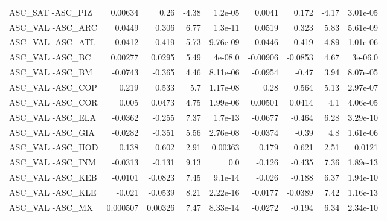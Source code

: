 \begin{tabular}{lrrrrrrrr}
ASC\_SAT -ASC\_PIZ                        &     0.00634 &         0.26 &   -4.38 &  1.2e-05 &     0.0041 &       0.172 &        -4.17 &      3.01e-05 \\
ASC\_VAL -ASC\_ARC                        &      0.0449 &        0.306 &    6.77 &  1.3e-11 &     0.0519 &       0.323 &         5.83 &      5.61e-09 \\
ASC\_VAL -ASC\_ATL                        &      0.0412 &        0.419 &    5.73 & 9.76e-09 &     0.0446 &       0.419 &         4.89 &      1.01e-06 \\
ASC\_VAL -ASC\_BC                         &     0.00277 &       0.0295 &    5.49 &  4e-08.0 &   -0.00906 &     -0.0853 &         4.67 &       3e-06.0 \\
ASC\_VAL -ASC\_BM                         &     -0.0743 &       -0.365 &    4.46 & 8.11e-06 &    -0.0954 &       -0.47 &         3.94 &      8.07e-05 \\
ASC\_VAL -ASC\_COP                        &       0.219 &        0.533 &     5.7 & 1.17e-08 &       0.28 &       0.564 &         5.13 &      2.97e-07 \\
ASC\_VAL -ASC\_COR                        &       0.005 &       0.0473 &    4.75 & 1.99e-06 &    0.00501 &      0.0414 &          4.1 &      4.06e-05 \\
ASC\_VAL -ASC\_ELA                        &     -0.0362 &       -0.255 &    7.37 &  1.7e-13 &    -0.0677 &      -0.464 &         6.28 &      3.29e-10 \\
ASC\_VAL -ASC\_GIA                        &     -0.0282 &       -0.351 &    5.56 & 2.76e-08 &    -0.0374 &       -0.39 &          4.8 &      1.61e-06 \\
ASC\_VAL -ASC\_HOD                        &       0.138 &        0.602 &    2.91 &  0.00363 &      0.179 &       0.621 &         2.51 &        0.0121 \\
ASC\_VAL -ASC\_INM                        &     -0.0313 &       -0.131 &    9.13 &      0.0 &     -0.126 &      -0.435 &         7.36 &      1.89e-13 \\
ASC\_VAL -ASC\_KEB                        &     -0.0101 &      -0.0823 &    7.45 &  9.1e-14 &     -0.026 &      -0.188 &         6.37 &      1.94e-10 \\
ASC\_VAL -ASC\_KLE                        &      -0.021 &      -0.0539 &    8.21 & 2.22e-16 &    -0.0177 &     -0.0389 &         7.42 &      1.16e-13 \\
ASC\_VAL -ASC\_MX                         &    0.000507 &      0.00326 &    7.47 & 8.33e-14 &    -0.0272 &      -0.194 &         6.34 &      2.34e-10 \\

\end{tabular}
